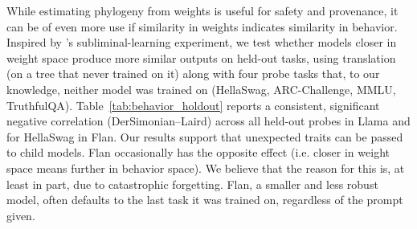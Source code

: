 \documentclass{article}
\theoremstyle{definition}
\theoremstyle{plain}
\begin{document}
While estimating phylogeny from weights is useful for safety and provenance, it can be of even more use if similarity in weights indicates similarity in behavior. Inspired by \citet{cloud2025subliminal}'s subliminal-learning experiment, we test
whether models closer in weight space produce more similar outputs on held-out tasks, using translation
(on a tree that never trained on it) along with four probe tasks that, to our knowledge, neither model
was trained on (HellaSwag, ARC-Challenge, MMLU, TruthfulQA).
Table~\ref{tab:behavior_holdout} reports a consistent, significant negative correlation (DerSimonian--Laird) across all held-out
probes in Llama and for HellaSwag in Flan.  Our results support that unexpected traits can be passed to child
models.   Flan occasionally has the opposite effect (i.e. closer in weight space means further in behavior space).  We believe that the reason for this is, at least in part, due to catastrophic forgetting.  Flan, a smaller and less robust model, often defaults to the last task it was trained on, regardless of the prompt given.
\end{document}
